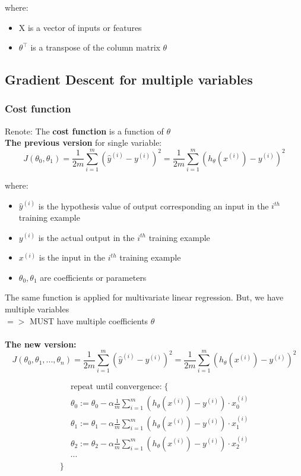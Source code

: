 where:
\begin{itemize}
	\item X is a vector of inputs or features
	\item $\theta^\intercal$ is a transpose of the column matrix $\theta$
\end{itemize}
\subsection{Gradient Descent for multiple variables}
\subsubsection{Cost function}
Renote: The \textbf{cost function} is a function of $\theta$ \\
\textbf{The previous version} for single variable:
\begin{equation*}
J(\theta_0, \theta_1) = \dfrac {1}{2m} \displaystyle \sum _{i=1}^m \left ( \hat{y}^{(i)}- y^{(i)} \right)^2 = \dfrac {1}{2m} \displaystyle \sum _{i=1}^m \left (h_\theta (x^{(i)}) - y^{(i)} \right)^2
\end{equation*}

where:
\begin{itemize}
	\item $\hat{y}^{(i)}$ is the hypothesis value of output corresponding an input in the $i^{th}$ training example
	\item $y^{(i)}$ is the actual output in the $i^{th}$ training example
	\item $x^{(i)}$ is the input in the $i^{th}$ training example
	\item $\theta_0, \theta_1$ are coefficients or parameters
\end{itemize}

The same function is applied for multivariate linear regression. But, we have multiple variables \\
$=>$ MUST have multiple coefficients $\theta$ \\\\

\textbf{The new version:}
\begin{equation*}
J(\theta_0, \theta_1, ..., \theta_n) = \dfrac {1}{2m} \displaystyle \sum _{i=1}^m \left ( \hat{y}^{(i)}- y^{(i)} \right)^2 = \dfrac {1}{2m} \displaystyle \sum _{i=1}^m \left (h_\theta (x^{(i)}) - y^{(i)} \right)^2
\end{equation*}

\begin{align*} 
	& \text{repeat until convergence:} \; \lbrace \\ \; 
	& \theta_0 := \theta_0 - \alpha \frac{1}{m} \sum\limits_{i=1}^{m} (h_\theta(x^{(i)}) - y^{(i)}) \cdot x_0^{(i)} \\ \; 
	& \theta_1 := \theta_1 - \alpha \frac{1}{m} \sum\limits_{i=1}^{m} (h_\theta(x^{(i)}) - y^{(i)}) \cdot x_1^{(i)} \\ \; 
	& \theta_2 := \theta_2 - \alpha \frac{1}{m} \sum\limits_{i=1}^{m} (h_\theta(x^{(i)}) - y^{(i)}) \cdot x_2^{(i)} \\
	& \cdots \\ \rbrace 
\end{align*}

